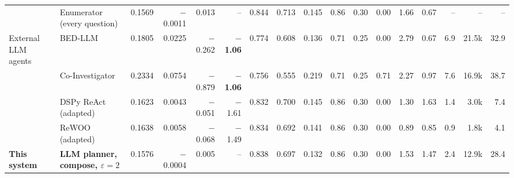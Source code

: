 \documentclass[11pt,a4paper]{article}
\begin{document}
\begin{landscape}
\begin{table}
{\begin{tabular}{llrrrrrrrrrrrrrrr}
 & Enumerator (every question) & 0.1569 & $-$0.0011 & 0.013 & -- & 0.844 & 0.713 & 0.145 & 0.86 & 0.30 & 0.00 & 1.66 & 0.67 & -- & -- & -- \\
\addlinespace[3pt]
External LLM agents & BED-LLM & 0.1805 & 0.0225 & $-$0.262 & \textbf{$-$1.06} & 0.774 & 0.608 & 0.136 & 0.71 & 0.25 & 0.00 & 2.79 & 0.67 & 6.9 & 21.5k & 32.9 \\
 & Co-Investigator & 0.2334 & 0.0754 & $-$0.879 & \textbf{$-$1.06} & 0.756 & 0.555 & 0.219 & 0.71 & 0.25 & 0.71 & 2.27 & 0.97 & 7.6 & 16.9k & 38.7 \\
 & DSPy ReAct (adapted) & 0.1623 & 0.0043 & $-$0.051 & $-$1.61 & 0.832 & 0.700 & 0.145 & 0.86 & 0.30 & 0.00 & 1.30 & 1.63 & 1.4 & 3.0k & 7.4 \\
 & ReWOO (adapted) & 0.1638 & 0.0058 & $-$0.068 & $-$1.49 & 0.834 & 0.692 & 0.141 & 0.86 & 0.30 & 0.00 & 0.89 & 0.85 & 0.9 & 1.8k & 4.1 \\
\addlinespace[3pt]
\textcolor{ours}{\textbf{This system}} & \textbf{LLM planner, compose, $\varepsilon=2$} & 0.1576 & $-$0.0004 & 0.005 & -- & 0.838 & 0.697 & 0.132 & 0.86 & 0.30 & 0.00 & 1.53 & 1.47 & 2.4 & 12.9k & 28.4 \\
\bottomrule
\end{tabular}}
\end{table}
\end{landscape}
\end{document}
